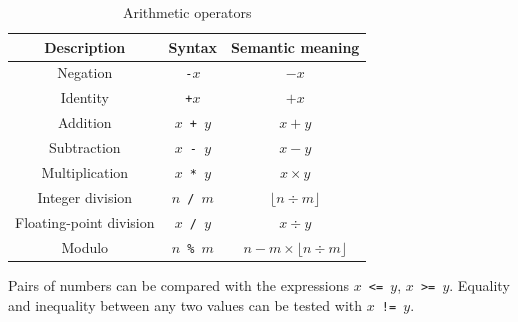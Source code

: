 \documentclass[UdineBachThesis,american,11pt]{PhdThesis}
\begin{document}
  \begin{table}[H]
    \centering

    \begin{tabular}{|c|c|c|}
      \hline

      Description &
      Syntax &
      Semantic meaning \\
      \hline

      Negation &
      \texttt{-$x$} &
      $-x$ \\

      Identity &
      \texttt{+$x$} &
      $+x$ \\

      Addition &
      \texttt{$x$ + $y$} &
      $x + y$ \\

      Subtraction &
      \texttt{$x$ - $y$} &
      $x - y$ \\

      Multiplication &
      \texttt{$x$ * $y$} &
      $x \times y$ \\

      Integer division &
      \texttt{$n$ / $m$} &
      $\lfloor n \div m \rfloor$ \\

      Floating-point division &
      \texttt{$x$ / $y$} &
      $x \div y$ \\

      Modulo &
      \texttt{$n$ \% $m$} &
      $n - m \times \lfloor n \div m \rfloor$ \\
      \hline
    \end{tabular}

    \caption{Arithmetic operators}
  \end{table}

  Pairs of numbers can be compared with the expressions
  \mbox{\texttt{$x$ <= $y$}}, \mbox{\texttt{$x$ >= $y$}}. Equality and
  inequality between any two values can be tested with
  \mbox{\texttt{$x$ != $y$}}.
\end{document}
